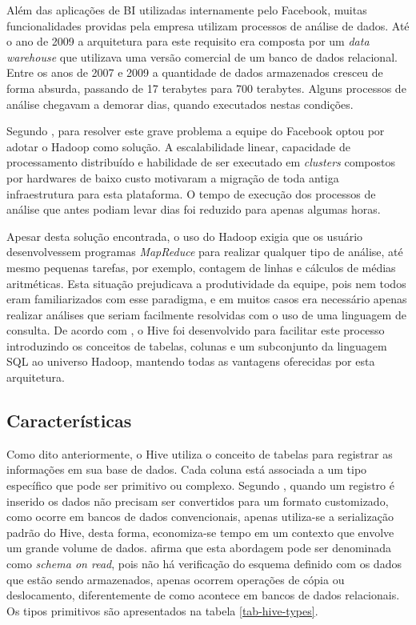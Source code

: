 Além das aplicações de BI utilizadas internamente pelo Facebook, muitas funcionalidades providas pela empresa utilizam processos de análise de dados. Até o ano de 2009 a arquitetura para este requisito era composta por um \textit{data warehouse} que utilizava uma versão comercial de um banco de dados relacional. Entre os anos de 2007 e 2009 a quantidade de dados armazenados cresceu de forma absurda, passando de 17 terabytes para 700 terabytes. Alguns processos de análise chegavam a demorar dias, quando executados nestas condições.

Segundo , para resolver este grave problema a equipe do Facebook optou por adotar o Hadoop como solução. A escalabilidade linear, capacidade de processamento distribuído e habilidade de ser executado em \textit{clusters} compostos por hardwares de baixo custo motivaram a migração de toda antiga infraestrutura para esta plataforma. O tempo de execução dos processos de análise que antes podiam levar dias foi reduzido para apenas algumas horas.

Apesar desta solução encontrada, o uso do Hadoop exigia que os usuário desenvolvessem programas \textit{MapReduce} para realizar qualquer tipo de análise, até mesmo pequenas tarefas, por exemplo, contagem de linhas e cálculos de médias aritméticas. Esta situação prejudicava a produtividade da equipe, pois nem todos eram familiarizados com esse paradigma, e em muitos casos era necessário apenas realizar análises que seriam facilmente resolvidas com o uso de uma linguagem de consulta. De acordo com , o Hive foi desenvolvido para facilitar este processo introduzindo os conceitos de tabelas, colunas e um subconjunto da linguagem SQL ao universo Hadoop, mantendo todas as vantagens oferecidas por esta arquitetura.

\subsection{Características}

Como dito anteriormente, o Hive utiliza o conceito de tabelas para registrar as informações em sua base de dados. Cada coluna está associada a um tipo específico que pode ser primitivo ou complexo. Segundo , quando um registro é inserido os dados não precisam ser convertidos para um formato customizado, como ocorre em bancos de dados convencionais, apenas utiliza-se a serialização padrão do Hive, desta forma, economiza-se tempo em um contexto que envolve um grande volume de dados.  afirma que esta abordagem pode ser denominada como \textit{schema on read}, pois não há verificação do esquema definido com os dados que estão sendo armazenados, apenas ocorrem operações de cópia ou deslocamento, diferentemente de como acontece em bancos de dados relacionais. Os tipos primitivos são apresentados na tabela \ref{tab-hive-types}.

